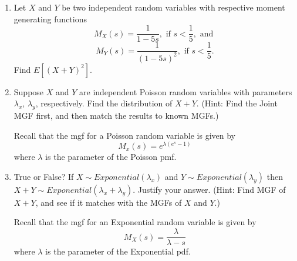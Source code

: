 \documentclass[
]{article}
\begin{document}
\begin{enumerate}
\def\labelenumi{\arabic{enumi}.}
\item
  Let \(X\) and \(Y\) be two independent random variables with respective moment generating functions
  \[M_X(s) = \frac{1}{1-5s}, \text{ if } s < \frac{1}{5}, \text{ and }\]
  \[M_Y(s) = \frac{1}{(1-5s)^2}, \text{ if } s < \frac{1}{5}.\]
  Find \(E[(X+Y)^2]\).
\item
  Suppose \(X\) and \(Y\) are independent Poisson random variables with parameters \(\lambda_x\), \(\lambda_y\), respectively. Find the distribution of \(X + Y\). (Hint: Find the Joint MGF first, and then match the results to known MGFs.)

  Recall that the mgf for a Poisson random variable is given by
  \[M_x(s) = e^{\lambda (e^s - 1)}\]
  where \(\lambda\) is the parameter of the Poisson pmf.
\item
  True or False? If \(X \sim Exponential(\lambda_x)\) and \(Y \sim Exponential(\lambda_y)\) then \(X + Y \sim Exponential(\lambda_x + \lambda_y)\). Justify your answer. (Hint: Find MGF of \(X + Y\), and see if it matches with the MGFs of \(X\) and \(Y\).)

  Recall that the mgf for an Exponential random variable is given by
  \[M_X(s) = \frac{\lambda}{\lambda - s}\]
  where \(\lambda\) is the parameter of the Exponential pdf.
\end{enumerate}
\end{document}
